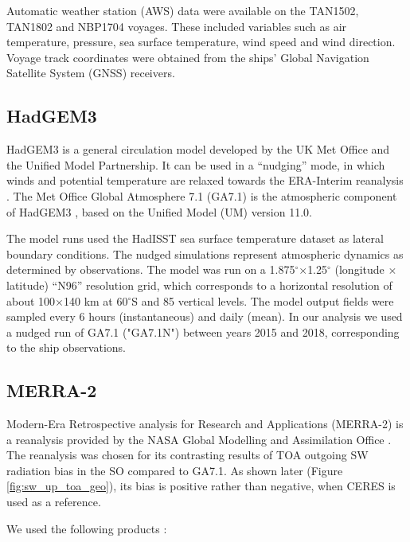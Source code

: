 Automatic weather station (AWS) data were available on the TAN1502, TAN1802 and
NBP1704 voyages. These included variables such as air temperature, pressure,
sea surface temperature, wind speed and wind direction. Voyage track
coordinates were obtained from the ships' Global Navigation Satellite System
(GNSS) receivers.

\subsection{HadGEM3}
\label{sec:hadgem3}
HadGEM3 \citep{walters2017} is a general circulation model developed by the UK
Met Office and the Unified Model Partnership.
It can be used in a ``nudging'' \citep{telford2008} mode, in which winds and
potential temperature are relaxed towards the ERA-Interim reanalysis
\citep{dee2011}. The Met Office Global Atmosphere 7.1 (GA7.1) is the atmospheric
component of HadGEM3 \citep{walters2017}, based on the Unified Model (UM)
version 11.0.

The model runs used the HadISST sea surface temperature dataset
\citep{rayner2003} as lateral boundary conditions. The nudged simulations
represent atmospheric dynamics as determined by observations. The model was run
on a 1.875$^\circ$$\times$1.25$^\circ$ (longitude $\times$ latitude) ``N96''
resolution grid, which corresponds to a horizontal resolution of about
100$\times$140 \unit{km} at 60$^\circ$S and 85 vertical levels. The model output
fields were sampled every 6 hours (instantaneous) and daily (mean). In our
analysis we used a nudged run of GA7.1 ("GA7.1N") between years 2015 and 2018,
corresponding to the ship observations.

\subsection{MERRA-2}
\label{sec:merra-2}

Modern-Era Retrospective analysis for Research and Applications (MERRA-2) is a
reanalysis provided by the NASA Global Modelling and Assimilation Office
\citep{gelaro2017}. The reanalysis was chosen for its contrasting results of
TOA outgoing SW radiation bias in the SO compared to GA7.1. As shown later
(Figure \ref{fig:sw_up_toa_geo}), its bias is positive rather than negative,
when CERES is used as a reference.

We used the following products \citep{bosilovich2015}:

